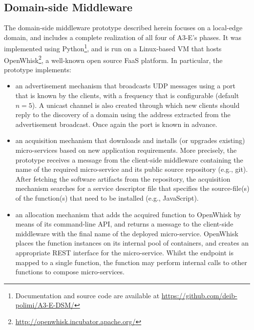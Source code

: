 \subsection{Domain-side Middleware}


The domain-side middleware prototype described herein focuses on a local-edge domain, and includes a complete realization of all four of A3-E's phases. It was implemented using Python\footnote{Documentation and source code are available at \url{https://github.com/deib-polimi/A3-E-DSM/}}, and is run on a Linux-based VM that hosts OpenWhisk\footnote{\url{http://openwhisk.incubator.apache.org/}}, a well-known open source FaaS platform. In particular, the prototype implements:

\begin{itemize}

	\item an advertisement mechanism that broadcasts UDP messages using a port that is known by the clients, with a frequency that is configurable (default $n=5$). A unicast channel is also created through which new clients should reply to the discovery of a domain using the address extracted from the advertisement broadcast. Once again the port is known in advance.

	\item an acquisition mechanism that downloads and installs (or upgrades existing) micro-services based on new application requirements. More precisely, the prototype receives a message from the client-side middleware containing the name of the required micro-service and its public source repository (e.g., git). After fetching the software artifacts from the repository, the acquisition mechanism searches for a service descriptor file that specifies the source-file(s) of the function(s) that need to be installed (e.g., JavaScript). 

	\item an allocation mechanism that adds the acquired function to OpenWhisk by means of its command-line API, and returns a message to the client-side middleware with the final name of the deployed micro-service. OpenWhisk places the function instances on its internal pool of containers, and creates an appropriate REST interface for the micro-service. Whilst the endpoint is mapped to a single function, the function may perform internal calls to other functions to compose micro-services.

\end{itemize}



